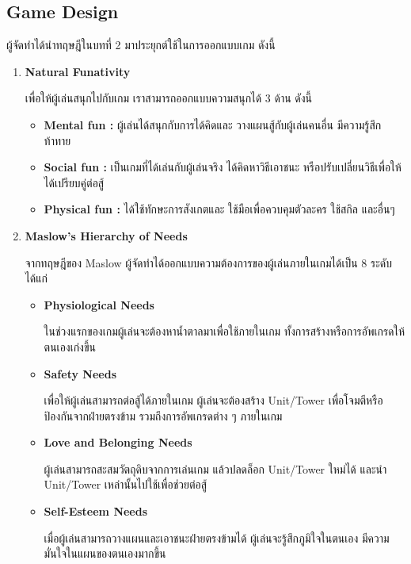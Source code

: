 \documentclass[12pt,oneside,openright,a4paper]{cpe-thai-project}
\begin{document}
\subsection{Game Design}

ผู้จัดทำได้นำทฤษฎีในบทที่ 2 มาประยุกต์ใช้ในการออกแบบเกม ดังนี้

\begin{enumerate}
  \item \textbf{Natural Funativity} 
  
  เพื่อให้ผู้เล่นสนุกไปกับเกม เราสามารถออกแบบความสนุกได้ 3 ด้าน ดังนี้
  
  \begin{itemize}
    \item \textbf{Mental fun :} ผู้เล่นได้สนุกกับการได้คิดและ
    วางแผนสู้กับผู้เล่นคนอื่น มีความรู้สึกท้าทาย
    \item \textbf{Social fun :} เป็นเกมที่ได้เล่นกับผู้เล่นจริง 
    ได้คิดหาวิธีเอาชนะ หรือปรับเปลี่ยนวิธีเพื่อให้ได้เปรียบคู่ต่อสู้
    \item \textbf{Physical fun :} ได้ใช้ทักษะการสังเกตและ
    ใช้มือเพื่อควบคุมตัวละคร ใช้สกิล และอื่นๆ
  \end{itemize}


  \item \textbf{Maslow’s Hierarchy of Needs}
  
  จากทฤษฎีของ Maslow ผู้จัดทำได้ออกแบบความต้องการของผู้เล่นภายในเกมได้เป็น 8 ระดับ ได้แก่

  \begin{itemize}
    \item \textbf{Physiological Needs} 
    
    ในช่วงแรกของเกมผู้เล่นจะต้องหาน้ำตาลมาเพื่อใช้ภายในเกม ทั้งการสร้างหรือการอัพเกรดให้ตนเองเก่งขึ้น

    \item \textbf{Safety Needs} 
    
    เพื่อให้ผู้เล่นสามารถต่อสู้ได้ภายในเกม ผู้เล่นจะต้องสร้าง Unit/Tower เพื่อโจมตีหรือป้องกันจากฝ่ายตรงข้าม รวมถึงการอัพเกรดต่าง ๆ ภายในเกม
    
    \item \textbf{Love and Belonging Needs} 
    
    ผู้เล่นสามารถสะสมวัตถุดิบจากการเล่นเกม แล้วปลดล็อก Unit/Tower ใหม่ได้ และนำ Unit/Tower เหล่านั้นไปใช้เพื่อช่วยต่อสู้
    
    \item \textbf{Self-Esteem Needs} 
    
    เมื่อผู้เล่นสามารถวางแผนและเอาชนะฝ่ายตรงข้ามได้ ผู้เล่นจะรู้สึกภูมิใจในตนเอง มีความมั่นใจในแผนของตนเองมากขึ้น
    

\end{itemize}
\end{enumerate}
\end{document}
